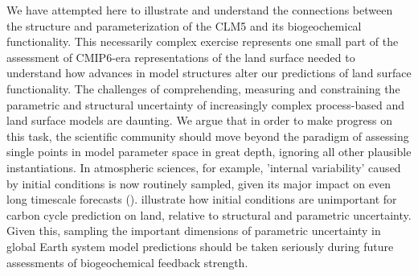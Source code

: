 \documentclass[draft,linenumbers]{agujournal}
\begin{document}
We have attempted here to illustrate and understand the connections between the structure and parameterization of the CLM5 and its biogeochemical functionality. This necessarily complex exercise represents one small part of the assessment of CMIP6-era representations of the land surface needed to understand how advances in model structures alter our predictions of land surface functionality.  The challenges of comprehending, measuring and constraining the parametric and structural uncertainty of increasingly complex process-based and land surface models are daunting. We argue that in order to make progress on this task, the scientific community should move beyond the paradigm of assessing single points in model parameter space in great depth, ignoring all other plausible instantiations. In atmospheric sciences, for example, 'internal variability' caused by initial conditions is now routinely sampled, given its major impact on even long timescale forecasts (\cite{kay2015}). \cite{bonan2018} illustrate how initial conditions are unimportant for carbon cycle prediction on land, relative to structural and parametric uncertainty. Given this, sampling the important dimensions of parametric uncertainty in global Earth system model predictions should be taken seriously during future assessments of biogeochemical feedback strength.
\end{document}

